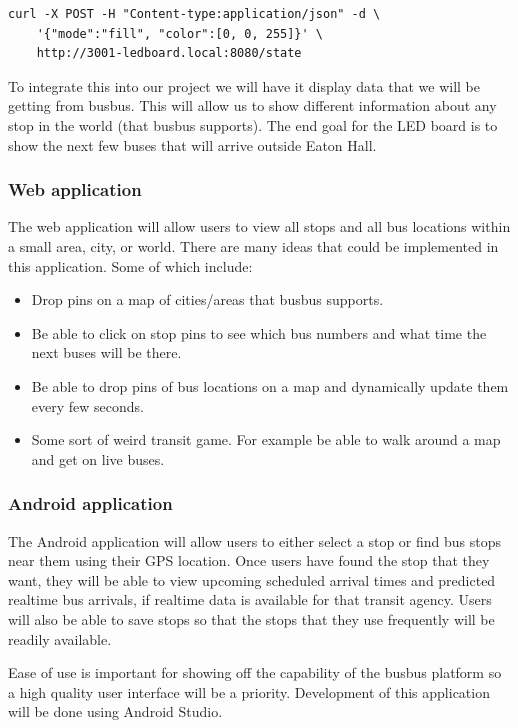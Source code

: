 \documentclass[12pt]{article}
\begin{document}
\begin{verbatim}
curl -X POST -H "Content-type:application/json" -d \
    '{"mode":"fill", "color":[0, 0, 255]}' \
    http://3001-ledboard.local:8080/state
\end{verbatim}

To integrate this into our project
we will have it display data that we will be getting from busbus.  This will allow
us to show different information about any stop in the world (that
busbus supports). The end goal for the LED board is to show the next few buses that will arrive outside Eaton Hall.

\subsubsection{Web application}
The web application will allow users to view all stops and all bus locations within a small area, city, or world.
There are many ideas that could be implemented in this application. Some of which include:

\begin{itemize}
    \item Drop pins on a map of cities/areas that busbus supports.
    \item Be able to click on stop pins to see which bus numbers and what time the next buses will be there.
    \item Be able to drop pins of bus locations on a map and dynamically update them every few seconds.
    \item Some sort of weird transit game. For example be able to walk around a map and get on live buses.
\end{itemize}

\subsubsection{Android application}
The Android application will allow users to either select a stop or find bus stops near them using their GPS location.
Once users have found the stop that they want, they will be able to view upcoming scheduled arrival times and
predicted realtime bus arrivals, if realtime data is available for that transit agency. Users will also be able
to save stops so that the stops that they use frequently will be readily available.

Ease of use is important
for showing off the capability of the busbus platform so a high quality user interface will be a priority.
Development of this application will be done using Android Studio.
\end{document}
